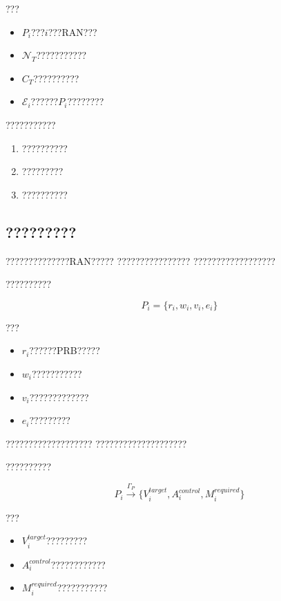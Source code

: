 ???

\begin{itemize}
    \item $P_i$???$i$???RAN???
    \item $\mathcal{N}_{T}$???????????
    \item $C_T$??????????
    \item $\mathcal{E}_i$??????$P_i$????????
\end{itemize}

???????????

\begin{enumerate}
    \item ??????????
    \item ?????????
    \item ??????????
\end{enumerate}


\subsection*{?????????}

??????????????RAN?????
????????????????
??????????????????

??????????

\begin{equation}
P_i
=
\{
r_i,w_i,v_i,e_i
\}
\end{equation}

???

\begin{itemize}
    \item $r_i$??????PRB?????
    \item $w_i$???????????
    \item $v_i$?????????????
    \item $e_i$?????????
\end{itemize}


???????????????????
????????????????????

??????????

\begin{equation}
P_i
\xrightarrow{\Gamma_P}
\{
V_i^{target},
A_i^{control},
M_i^{required}
\}
\end{equation}

???

\begin{itemize}
    \item $V_i^{target}$?????????
    \item $A_i^{control}$????????????
    \item $M_i^{required}$???????????
\end{itemize}


